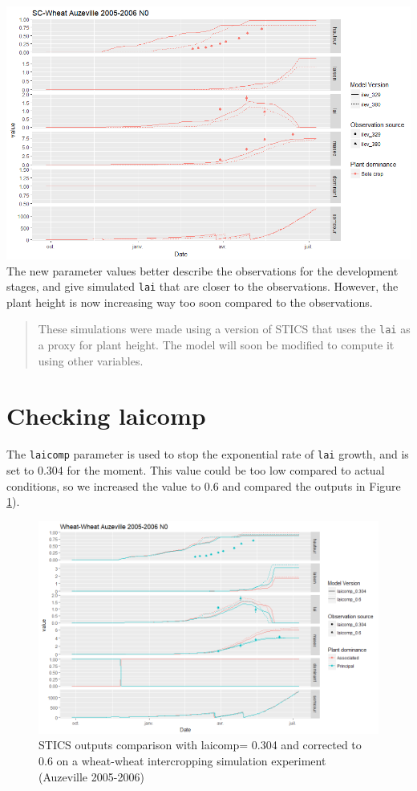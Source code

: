 \documentclass[]{book}
\begin{document}
\includegraphics{img/ilevSC.png}
The new parameter values better describe the observations for the development stages, and give simulated \texttt{lai} that are closer to the observations. However, the plant height is now increasing way too soon compared to the observations.

\begin{quote}
These simulations were made using a version of STICS that uses the \texttt{lai} as a proxy for plant height. The model will soon be modified to compute it using other variables.
\end{quote}

\hypertarget{checking-laicomp}{%
\section{Checking laicomp}\label{checking-laicomp}}

The \texttt{laicomp} parameter is used to stop the exponential rate of \texttt{lai} growth, and is set to 0.304 for the moment.
This value could be too low compared to actual conditions, so we increased the value to 0.6 and compared the outputs in Figure \ref{fig:laicomp}).

\begin{figure}
\centering
\includegraphics{img/laicomp.png}
\caption{\label{fig:laicomp}STICS outputs comparison with laicomp= 0.304 and corrected to 0.6 on a wheat-wheat intercropping simulation experiment (Auzeville 2005-2006)}
\end{figure}
\end{document}

